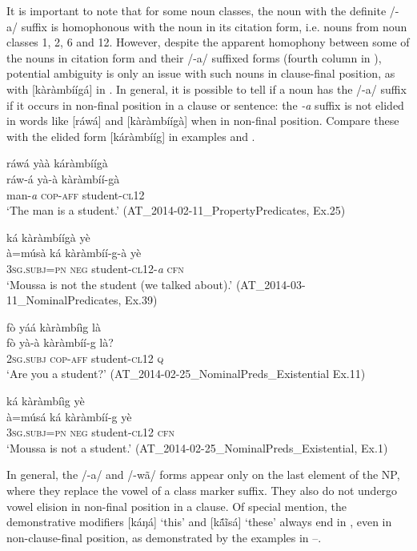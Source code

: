 \documentclass[output=paper]{langsci/langscibook}
\begin{document}
It is important to note that for some noun classes, the noun with the definite /-a/ suffix is homophonous with the noun in its citation form, i.e. nouns from noun classes 1, 2, 6 and 12. However, despite the apparent homophony between some of the nouns in citation form and their /-a/ suffixed forms (fourth column in ), potential ambiguity is only an issue with such nouns in clause-final position, as with [kàràmbíígá] in . In general, it is possible to tell if a noun has the /-a/ suffix if it occurs in non-final position in a clause or sentence: the \textit{-a} suffix is not elided in words like [ráwá]  and [kàràmbíígà]  when in non-final position. Compare these with the elided form [káràmbííg] in examples  and .

\ea\label{ex:teo:17}
\glll ráwá yàà káràmbíígà\\
ráw-á yà-à kàràmbíí-gà\\
man-\textit{a} \textsc{cop-aff} student-\textsc{cl12}\\
\glt ‘The man is a student.’ (AT\_2014-02-11\_PropertyPredicates, Ex.25)
\z


\ea\label{ex:teo:18}
 ká kàràmbíígà yè\\
à=músà ká kàràmbíí-g-à yè \\
3\textsc{sg.subj=pn} \textsc{neg} student-\textsc{cl}12-\textit{a} \textsc{cfn}\\
\glt ‘Moussa is not the student (we talked about).’ (AT\_2014-03-11\_NominalPredicates, Ex.39)
\z

\ea\label{ex:teo:19}
\glll fò yáá kàràmbíìg là\\
 fò yà-à kàràmbíí-g là?\\
2\textsc{sg.subj} \textsc{cop-aff} student-\textsc{cl}12 \textsc{q}\\
\glt ‘Are you a student?’ (AT\_2014-02-25\_NominalPreds\_Existential Ex.11)
\z

\ea\label{ex:teo:20}
 ká kàràmbíìg yè\\
 à=músá ká kàràmbíí-g yè\\
3\textsc{sg.subj=pn} \textsc{neg} student-\textsc{cl}12 \textsc{cfn}\\
\glt ‘Moussa is not a student.’ (AT\_2014-02-25\_NominalPreds\_Existential, Ex.1)
\z

In general, the /-a/ and /-wã/ forms appear only on the last element of the NP, where they replace the vowel of a class marker suffix. They also do not undergo vowel elision in non-final position in a clause. Of special mention, the demonstrative modifiers [káŋá] ‘this’ and [k\'{ã}\~{i}sá] ‘these’ always end in \-[-a], even in non-clause-final position, as demonstrated by the examples in –.
\end{document}
